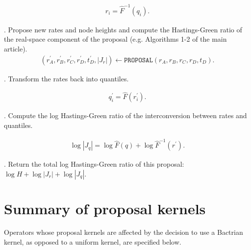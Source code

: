 \documentclass[12pt]{article}
\begin{document}
\begin{align}
	r_i = \hat{F}^{-1}(q_i).
\end{align}


. Propose new rates and node heights and compute the Hastings-Green ratio of the real-space component of the proposal (e.g. Algorithms 1-2 of the main article).    \\


\begin{align}
	(r_A^\prime, r_B^\prime, r_C^\prime, r_D^\prime, t_D^\prime, |J_r|) \leftarrow \texttt{PROPOSAL}(r_A, r_B, r_C, r_D, t_D).
\end{align}


. Transform the rates back into quantiles.

\begin{align}
	q_i^\prime = \hat{F}(r_i^\prime).
\end{align}


. Compute the log Hastings-Green ratio of the interconversion between rates and quantiles.


\begin{align}
	\log|J_q| = \log \hat{F}(q) + \log \hat{F}^{-1}(r^\prime).
\end{align}



. Return the total log Hastings-Green ratio of this proposal: $\log H + \log|J_r| + \log|J_q|$.




\clearpage
\section{Summary of proposal kernels}


Operators whose proposal kernels are affected by the decision to use a Bactrian kernel, as opposed to a uniform kernel, are specified below.  
\end{document}
